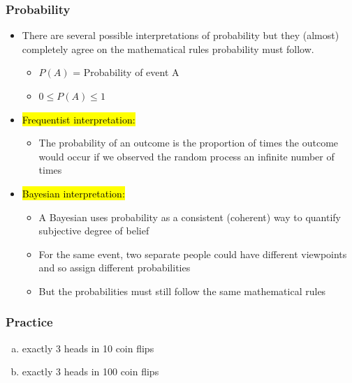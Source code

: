 \documentclass[11pt,containsverbatim,handout]{beamer}
\begin{document}

\begin{frame}
\frametitle{Probability}

\begin{itemize}

    \item There are several possible interpretations of probability but they (almost) completely agree on the mathematical rules probability must follow.
    \begin{itemize}
        \item $P(A)$ = Probability of event A 
        \item $0 \le P(A) \le 1$
    \end{itemize}

    \pause

    \item \hl{Frequentist interpretation:} 
    \begin{itemize}
        \item The probability of an outcome is the proportion of times the outcome would occur if we observed the random process an infinite number of times
    \end{itemize}

    \pause

    \item \hl{Bayesian interpretation:} 
    \begin{itemize}
        \item A Bayesian uses probability as a consistent (coherent) way to quantify subjective degree of belief
        \item For the same event, two separate people could have different viewpoints and so assign different probabilities
        \item But the probabilities must still follow the same mathematical rules
    \end{itemize}
\end{itemize}

\end{frame}


\begin{frame}
\frametitle{Practice}


\begin{enumerate}[(a)]
\item exactly 3 heads in 10 coin flips
\item exactly 3 heads in 100 coin flips
\end{enumerate}

\end{frame}
\end{document}
